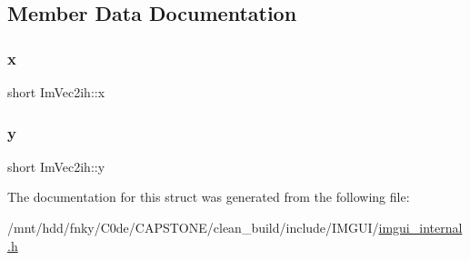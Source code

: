 \subsection{Member Data Documentation}
\mbox{\label{structImVec2ih_a0963e82728b3ea68d882089e1f5e231b}} 
\subsubsection{\texorpdfstring{x}{x}}
{\footnotesize\ttfamily short Im\+Vec2ih\+::x}

\mbox{\label{structImVec2ih_af8489174701c9070f3874cce8c1e514f}} 
\subsubsection{\texorpdfstring{y}{y}}
{\footnotesize\ttfamily short Im\+Vec2ih\+::y}



The documentation for this struct was generated from the following file\+:\begin{DoxyCompactItemize}
\item 
/mnt/hdd/fnky/\+C0de/\+C\+A\+P\+S\+T\+O\+N\+E/clean\+\_\+build/include/\+I\+M\+G\+U\+I/\hyperlink{imgui__internal_8h}{imgui\+\_\+internal.\+h}\end{DoxyCompactItemize}
